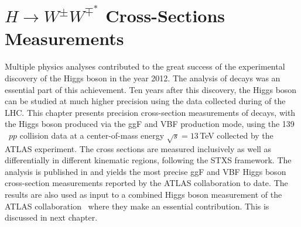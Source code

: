 \chapter{$H\rightarrow W^{\pm}W^{\mp^*}$ Cross-Sections Measurements}
\label{chap:hww}
Multiple physics analyses contributed to the great success of the experimental discovery of the Higgs boson in the year 2012. The analysis of \HWW decays was an essential part of this achievement. 
Ten years after this discovery, the Higgs boson can be studied at much higher precision using the data collected during \RunTwo of the LHC. 
This chapter presents precision cross-section measurements of \HWW decays, with the Higgs boson produced via the ggF and VBF production mode, using the 139\,\ifb\ $pp$ collision data at a center-of-mass energy $\sqrt{s} = 13\,$TeV collected by the ATLAS experiment.
The cross sections are measured inclusively as well as differentially in different kinematic regions, following the STXS framework.
The analysis is published in  and yields the most precise ggF and VBF Higgs boson cross-section measurements reported by the ATLAS collaboration to date.
The results are also used as input to a combined Higgs boson measurement of the ATLAS collaboration~\cite{NaturePaper} where they make an essential contribution. This is discussed in next chapter. 

